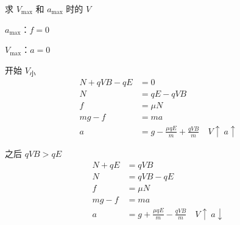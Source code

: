 \begin{problem}
求 $V_{\max}$ 和 $a_{\max}$ 时的 $V$
\begin{solution}
$a_{\max}$：$f=0$ %

$V_{\max}$：$a=0$

\noindent
\begin{minipage}[t]{0.48\linewidth}
开始 $V_{\text{小}}$
\begin{align*}
N+qVB-qE&=0\\
N&=qE-qVB\\
f&=\mu N\\
mg-f&=ma\\
a&=g-\frac{\mu qE}{m}+\frac{qVB}{m}\quad V\uparrow\ a\uparrow
\end{align*}
\end{minipage}\hfill
\begin{minipage}[t]{0.48\linewidth}
之后 $qVB>qE$
\begin{align*}
N+qE&=qVB\\
N&=qVB-qE\\
f&=\mu N\\
mg-f&=ma\\
a&=g+\frac{\mu qE}{m}-\frac{qVB}{m}\quad V\uparrow\ a\downarrow
\end{align*}
\end{minipage}
\end{solution}
\end{problem}
